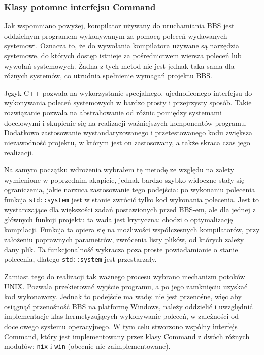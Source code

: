 \subsubsection{Klasy potomne interfejsu Command}

Jak wspomniano powyżej, kompilator używany do uruchamiania BBS jest oddzielnym programem wykonywanym za pomocą poleceń wydawanych systemowi. Oznacza to, że do wywołania kompilatora używane są narzędzia systemowe, do których dostęp istnieje za pośrednictwem wiersza poleceń lub wywołań systemowych. Żadna z tych metod nie jest jednak taka sama dla różnych systemów, co utrudnia spełnienie wymagań projektu BBS.

Język C++ pozwala na wykorzystanie specjalnego, ujednoliconego interfejsu do wykonywania poleceń systemowych w bardzo prosty i przejrzysty sposób. Takie rozwiązanie pozwala na abstrahowanie od różnic pomiędzy systemami docelowymi i skupienie się na realizacji ważniejszych komponentów programu. Dodatkowo zastosowanie wystandaryzowanego i przetestowanego kodu zwiększa niezawodność projektu, w którym jest on zastosowany, a także skraca czas jego realizacji.

Na samym początku wdrożenia wybrałem tę metodę ze względu na zalety wymienione w poprzednim akapicie, jednak bardzo szybko widoczne stały się ograniczenia, jakie narzuca zastosowanie tego podejścia: po wykonaniu polecenia funkcja \texttt{std::system} jest w stanie zwrócić tylko kod wykonania polecenia. Jest to wystarczające dla większości zadań postawionych przed BBS-em, ale dla jednej z głównych funkcji projektu ta wada jest krytyczna: chodzi o optymalizację kompilacji. Funkcja ta opiera się na możliwości współczesnych kompilatorów, przy założeniu poprawnych parametrów, zwrócenia listy plików, od których zależy dany plik. Ta funkcjonalność wykracza poza proste powiadamianie o stanie polecenia, dlatego \texttt{std::system} jest przestarzały.

Zamiast tego do realizacji tak ważnego procesu wybrano mechanizm potoków UNIX. Pozwala przekierować wyjście programu, a po jego zamknięciu uzyskać kod wykonawczy. Jednak to podejście ma wadę: nie jest przenośne, więc aby osiągnąć przenośność BBS na platformę Windows, należy oddzielić i uwzględnić implementacje klas hermetyzujących wykonywanie poleceń, w zależności od docelowego systemu operacyjnego. W tym celu stworzono wspólny interfejs Command, który jest implementowany przez klasy Command z dwóch różnych modułów: \texttt{nix} i \texttt{win} (obecnie nie zaimplementowane).

